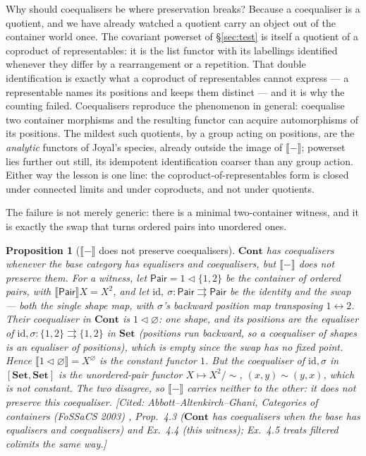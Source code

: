\documentclass[11pt,a4paper]{book}
\newcommand{\Set}{\mathbf{Set}}
\newcommand{\Cont}{\mathbf{Cont}}
\newcommand{\cont}[2]{#1 \triangleleft #2}
\newcommand{\Ext}[1]{\llbracket #1 \rrbracket}
\newcommand{\id}{\mathrm{id}}
\theoremstyle{plain}
\newtheorem{Proposition}[Theorem]{Proposition}
\theoremstyle{definition}
\theoremstyle{remark}
\newcommand{\prov}[1]{\hfill\textsf{\footnotesize[#1]}}
\begin{document}
Why should coequalisers be where preservation breaks? Because a coequaliser is a
quotient, and we have already watched a quotient carry an object out of the
container world once. The covariant powerset of \S\ref{sec:test} is itself a
quotient of a coproduct of representables: it is the list functor with its
labellings identified whenever they differ by a rearrangement or a repetition. That
double identification is exactly what a coproduct of representables cannot express
--- a representable names its positions and keeps them distinct --- and it is why
the counting failed. Coequalisers reproduce the phenomenon in general: coequalise
two container morphisms and the resulting functor can acquire automorphisms of its
positions. The mildest such quotients, by a group acting on positions, are the
\emph{analytic} functors of Joyal's species, already outside the image of
$\Ext{-}$; powerset lies further out still, its idempotent identification coarser
than any group action. Either way the lesson is one line: the
coproduct-of-representables form is closed under connected limits and under
coproducts, and not under quotients.

The failure is not merely generic: there is a minimal two-container witness, and it
is exactly the swap that turns ordered pairs into unordered ones.

\begin{Proposition}[$\Ext{-}$ does not preserve coequalisers]\label{prop:coeq-fail}
$\Cont$ has coequalisers whenever the base category has equalisers and coequalisers,
but $\Ext{-}$ does not preserve them. For a witness, let
$\mathsf{Pair}=\cont 1{\{1,2\}}$ be the container of ordered pairs, with
$\Ext{\mathsf{Pair}}X=X^{2}$, and let
$\id,\ \sigma\colon\mathsf{Pair}\rightrightarrows\mathsf{Pair}$ be the identity and
the swap --- both the single shape map, with $\sigma$'s backward position map
transposing $1\leftrightarrow2$. Their coequaliser in $\Cont$ is $\cont 1\varnothing$:
one shape, and its positions are the \emph{equaliser} of $\id,\sigma\colon\{1,2\}
\rightrightarrows\{1,2\}$ in $\Set$ (positions run backward, so a coequaliser of
shapes is an equaliser of positions), which is empty since the swap has no fixed
point. Hence $\Ext{\cont 1\varnothing}=X^{\varnothing}$ is the constant functor $1$.
But the coequaliser of $\id,\sigma$ in $[\Set,\Set]$ is the \emph{unordered}-pair
functor $X\mapsto X^{2}/\!\!\sim$, $(x,y)\sim(y,x)$, which is not constant. The two
disagree, so $\Ext{-}$ carries neither to the other: it does not preserve this
coequaliser.
\prov{Cited: Abbott--Altenkirch--Ghani, \emph{Categories of containers} (FoSSaCS 2003)
\cite{AAGcat}, Prop.~4.3 ($\Cont$ has coequalisers when the base has equalisers and
coequalisers) and Ex.~4.4 (this witness); Ex.~4.5 treats filtered colimits the same way.}
\end{Proposition}
\end{document}
